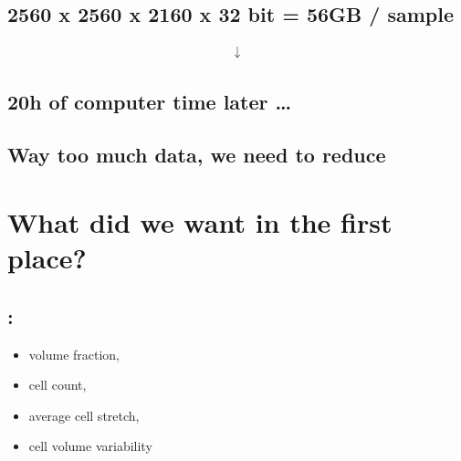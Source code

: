 \documentclass[letterpaper,10pt,english]{sphinxmanual}
\begin{document}
\subsection{2560 x 2560 x 2160 x 32 bit = 56GB / sample}
\label{\detokenize{04-BasicSegmentation:center-2560-x-2560-x-2160-x-32-bit-56gb-sample-center}}

\begin{equation*}
\begin{split}\downarrow\end{split}
\end{equation*}

\subsection{20h of computer time later …}
\label{\detokenize{04-BasicSegmentation:center-20h-of-computer-time-later-center}}





\subsection{Way too much data, we need to reduce}
\label{\detokenize{04-BasicSegmentation:way-too-much-data-we-need-to-reduce}}



\section{What did we want in the first place?}
\label{\detokenize{04-BasicSegmentation:what-did-we-want-in-the-first-place}}

\subsection{:}
\label{\detokenize{04-BasicSegmentation:single-numbers}}\begin{itemize}
\item {} 
\sphinxAtStartPar
volume fraction,

\item {} 
\sphinxAtStartPar
cell count,

\item {} 
\sphinxAtStartPar
average cell stretch,

\item {} 
\sphinxAtStartPar
cell volume variability

\end{itemize}
\end{document}
